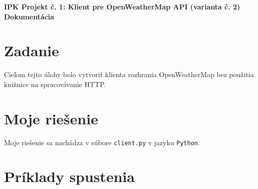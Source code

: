 \documentclass[11pt, a4paper]{article}
\begin{document}
\begin{center}
\Large \textbf{IPK Projekt č. 1: Klient pre OpenWeatherMap API (varianta č. 2)}
\textbf{Dokumentácia}
\end{center}

\section{Zadanie}
Cieľom tejto úlohy bolo vytvoriť klienta rozhrania OpenWeatherMap bez použitia knižnice na spracovávanie HTTP.
\section{Moje riešenie}
Moje riešenie sa nachádza v súbore \texttt{client.py} v jazyku \texttt{Python}.
\section{Príklady spustenia}
\end{document}
